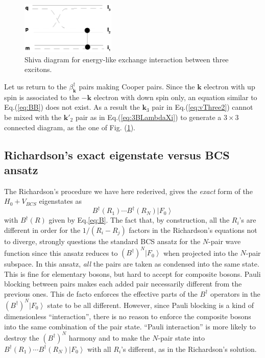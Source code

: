 \documentclass[epj]{svjour}
\newcommand{\vk}{\ensuremath{\mathbf{k}}}
\begin{document}
 
\begin{figure}[htb]
   \includegraphics[width=0.4\textwidth]{threeExciton.eps}
\caption{Shiva diagram for energy-like exchange interaction between three excitons.\label{fig:threeExciton} }
 \end{figure}


Let us return to the $\beta^\dagger_\vk$ pairs making Cooper pairs. Since the $\vk$ electron with up spin is associated to the $-\vk$ electron with down spin only, an equation similar to Eq.(\ref{eq:BB}) does not exist.  As a result the $\vk_3$ pair in Eq.(\ref{eq:vThree2}) cannot be mixed with the $\vk'_2$ pair as in Eq.(\ref{eq:3BLambdaXi}) to generate a $3\times3$ connected diagram, as the one of Fig. (\ref{fig:threeExciton}).


\subsection{Richardson's exact eigenstate versus BCS ansatz}

The Richardson's procedure we have here rederived, gives the 
\emph{exact} form of the $H_0+V_{BCS}$ eigenstates as 
\begin{equation}
B^{\dagger}(R_1)\cdots{}B^{\dagger}(R_N)\left|F_0\right>  
\end{equation}
with $B^{\dagger}(R)$ given by Eq.\eqref{eq:B}. The fact that, by
construction, all the $R_i$'s are different in order for the $1/(R_i-R_j)$ factors in the Richardson's equations not to diverge, strongly questions the standard
BCS ansatz for the $N$-pair wave function since this ansatz reduces to $\left(B^{\dagger}\right)
^N\left|F_0\right> $ when projected into the $N$-pair subspace. In this ansatz,  \emph{all} the pairs are taken as condensed into the same state. This is fine for elementary bosons, but hard to accept for composite bosons. Pauli blocking between pairs  makes each added pair necessarily different from the previous ones. This de facto enforces the effective parts of the $B^{\dagger}$ operators in the $(B^{\dagger})^{N}\left|F_0\right>$ state to be all different.  However, since Pauli blocking is a kind of dimensionless ``interaction'', there is no reason to enforce the composite bosons into the same combination of the pair state. ``Pauli interaction'' is more likely to destroy the $\left(B^{\dagger}\right)^N$ harmony and to make the $N$-pair state into $B^{\dagger}(R_{1})\cdots{}B^{\dagger}(R_{N})\left|F_0\right>$ with all $R_{i}$'s different, as in the Richardson's solution. 
\end{document}
